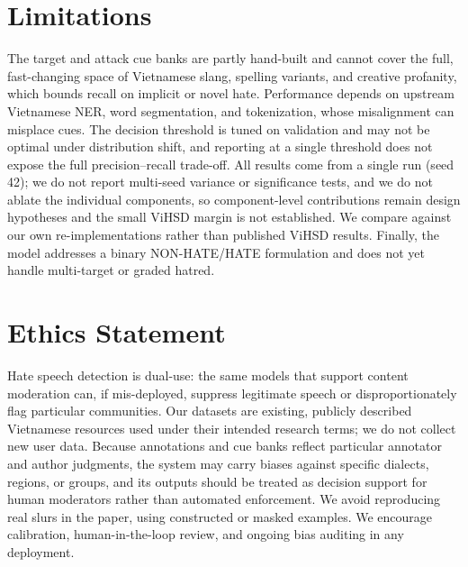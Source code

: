 \documentclass[11pt]{article}
\begin{document}
\section*{Limitations}
The target and attack cue banks are partly hand-built and cannot cover the full, fast-changing space of Vietnamese slang, spelling variants, and creative profanity, which bounds recall on implicit or novel hate. Performance depends on upstream Vietnamese NER, word segmentation, and tokenization, whose misalignment can misplace cues. The decision threshold is tuned on validation and may not be optimal under distribution shift, and reporting at a single threshold does not expose the full precision--recall trade-off. All results come from a single run (seed 42); we do not report multi-seed variance or significance tests, and we do not ablate the individual components, so component-level contributions remain design hypotheses and the small ViHSD margin is not established. We compare against our own re-implementations rather than published ViHSD results. Finally, the model addresses a binary NON-HATE/HATE formulation and does not yet handle multi-target or graded hatred.

\section*{Ethics Statement}
Hate speech detection is dual-use: the same models that support content moderation can, if mis-deployed, suppress legitimate speech or disproportionately flag particular communities. Our datasets are existing, publicly described Vietnamese resources used under their intended research terms; we do not collect new user data. Because annotations and cue banks reflect particular annotator and author judgments, the system may carry biases against specific dialects, regions, or groups, and its outputs should be treated as decision support for human moderators rather than automated enforcement. We avoid reproducing real slurs in the paper, using constructed or masked examples. We encourage calibration, human-in-the-loop review, and ongoing bias auditing in any deployment.




\appendix
\end{document}

